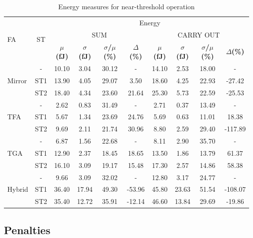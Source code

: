 \documentclass[pgmicro,mestrado,english]{iiufrgs}
\begin{document}
\begin{table}[]
\centering
\caption{Energy measures for near-threshold operation}
\label{energiaNT}
\begin{tabular}{lccccccccc}
\hline
\multirow{3}{*}{FA} & \multirow{3}{*}{ST} & \multicolumn{8}{c}{Energy} \\ \cline{3-10}
& & \multicolumn{4}{c}{SUM} & \multicolumn{4}{c}{CARRY OUT} \\ \cline{3-10}
& & \textbf{$\mu$(fJ)} & \textbf{$\sigma$(fJ)} & \textbf{$\sigma$/$\mu$(\%)} & \textbf{$\Delta$(\%)} & \textbf{$\mu$(fJ)} & \textbf{$\sigma$(fJ)} & \textbf{$\sigma$/$\mu$(\%)} & \textbf{$\Delta$(\%)} \\ \hline
\multirow{3}{*}{Mirror} & - & 10.10 & 3.04 & 30.12 & - & 14.10 & 2.53 & 18.00 & - \\ \cline{2-10}
& ST1 & 13.90 & 4.05 & 29.07 & 3.50 & 18.60 & 4.25 & 22.93 & -27.42 \\ \cline{2-10}
& ST2 & 18.40 & 4.34 & 23.60 & 21.64 & 25.30 & 5.73 & 22.59 & -25.53 \\ \hline
\multirow{3}{*}{TFA} & - & 2.62 & 0.83 & 31.49 & - & 2.71 & 0.37 & 13.49 & - \\ \cline{2-10}
& ST1 & 5.67 & 1.34 & 23.69 & 24.76 & 5.69 & 0.63 & 11.01 & 18.38 \\ \cline{2-10}
& ST2 & 9.69 & 2.11 & 21.74 & 30.96 & 8.80 & 2.59 & 29.40 & -117.89 \\ \hline
\multirow{3}{*}{TGA} & - & 6.87 & 1.56 & 22.68 & - & 8.11 & 2.90 & 35.70 & - \\ \cline{2-10}
& ST1 & 12.90 & 2.37 & 18.45 & 18.65 & 13.50 & 1.86 & 13.79 & 61.37 \\ \cline{2-10}
& ST2 & 16.10 & 3.09 & 19.17 & 15.48 & 17.30 & 2.57 & 14.86 & 58.38 \\ \hline
\multirow{3}{*}{Hybrid} & - & 9.66 & 3.09 & 32.02 & - & 12.80 & 3.17 & 24.77 & - \\ \cline{2-10}
& ST1 & 36.40 & 17.94 & 49.30 & -53.96 & 45.80 & 23.63 & 51.54 & -108.07 \\ \cline{2-10}
& ST2 & 35.40 & 12.72 & 35.91 & -12.14 & 46.60 & 13.84 & 29.69 & -19.86 \\ \hline
\end{tabular}
\end{table}

\vspace{-1.5em}

 \subsection{Penalties}
\end{document}
